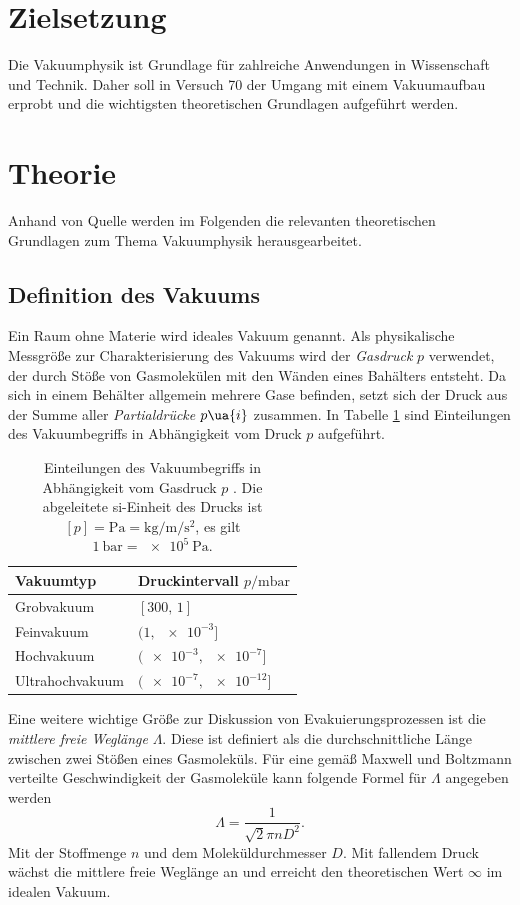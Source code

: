 \setcounter{page}{1}
\section*{Zielsetzung}
Die Vakuumphysik ist Grundlage für zahlreiche Anwendungen in Wissenschaft und Technik. Daher
soll in Versuch 70 der Umgang mit einem Vakuumaufbau erprobt und die wichtigsten
theoretischen Grundlagen aufgeführt werden.
\section{Theorie}
Anhand von Quelle \cite{dem1} werden im Folgenden die relevanten theoretischen Grundlagen zum Thema
Vakuumphysik herausgearbeitet.
\subsection{Definition des Vakuums}
Ein Raum ohne Materie wird ideales Vakuum genannt. Als physikalische Messgröße zur Charakterisierung
des Vakuums wird der \emph{Gasdruck} $p$ verwendet, der durch Stöße von Gasmolekülen mit den Wänden eines Bahälters
entsteht. Da sich in einem Behälter allgemein mehrere Gase befinden, setzt sich der Druck aus der Summe aller
\emph{Partialdrücke} $p\ua{i}$ zusammen.
In Tabelle \ref{tab: vakuumbegriffe} sind Einteilungen des Vakuumbegriffs in Abhängigkeit vom
Druck $p$ aufgeführt.
\begin{table}
  \centering
  \caption{Einteilungen des Vakuumbegriffs in Abhängigkeit vom Gasdruck $p$ \cite{dem1}. Die abgeleitete si-Einheit des Drucks ist
  $[p] = \si{\pascal} = \si{\kilogram \per\meter\per \second\squared}$, es gilt $\SI{1}{\bar} = \SI{e5}{\pascal}$.}
  \label{tab: vakuumbegriffe}
  \begin{tabular}{l l}
    \toprule
    {Vakuumtyp} & {Druckintervall $p/\si{\milli\bar}$} \\
    \midrule
    Grobvakuum &  $[\num{300},\,\num{1}]$ \\
    Feinvakuum &  $(\num{1},\,\num{e-3}]$ \\
    Hochvakuum &  $(\num{e-3},\,\num{e-7}]$ \\
    Ultrahochvakuum &  $(\num{e-7},\,\num{e-12}]$ \\
    \bottomrule
  \end{tabular}
\end{table}
\FloatBarrier Eine weitere wichtige Größe zur Diskussion von Evakuierungsprozessen ist die \emph{mittlere freie
Weglänge} $\Lambda$. Diese ist definiert als die durchschnittliche Länge zwischen zwei Stößen
eines Gasmoleküls. Für eine gemäß Maxwell und Boltzmann verteilte Geschwindigkeit der Gasmoleküle kann
folgende Formel für $\Lambda$ angegeben werden
\begin{equation}
  \Lambda = \frac{1}{\sqrt{2}\pi n D^2}.
\end{equation}
Mit der Stoffmenge $n$ und dem Moleküldurchmesser $D$. Mit fallendem Druck wächst die mittlere freie
Weglänge an und erreicht den theoretischen Wert $\infty$ im idealen Vakuum.

